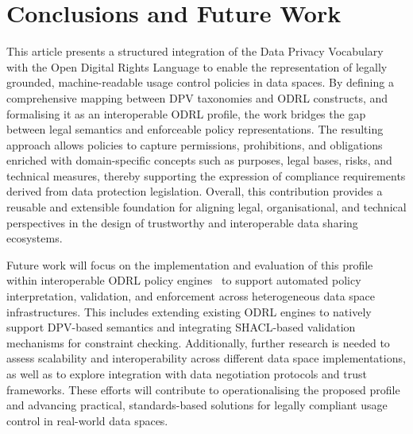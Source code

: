 \section{Conclusions and Future Work}
\label{sec:conclusions}

This article presents a structured integration
of the Data Privacy Vocabulary with the Open Digital Rights Language
to enable the representation of legally grounded,
machine-readable usage control policies in data spaces.
By defining a comprehensive mapping between DPV taxonomies and ODRL constructs,
and formalising it as an interoperable ODRL profile,
the work bridges the gap between legal semantics
and enforceable policy representations.
The resulting approach allows policies to capture
permissions, prohibitions, and obligations
enriched with domain-specific concepts such as
purposes, legal bases, risks, and technical measures,
thereby supporting the expression of compliance requirements
derived from data protection legislation.
Overall,
this contribution provides a reusable and extensible foundation
for aligning legal, organisational, and technical perspectives
in the design of trustworthy and interoperable data sharing ecosystems.

Future work will focus on the implementation and
evaluation of this profile
within interoperable ODRL policy engines~\cite{slabbinck_interoperable_2025}
to support automated policy interpretation, validation, and enforcement
across heterogeneous data space infrastructures.
This includes extending existing ODRL engines
to natively support DPV-based semantics and
integrating SHACL-based validation mechanisms for constraint checking.
Additionally,
further research is needed to assess scalability and interoperability
across different data space implementations,
as well as to explore integration with data negotiation protocols and trust frameworks.
These efforts will contribute
to operationalising the proposed profile and
advancing practical, standards-based solutions
for legally compliant usage control in real-world data spaces.